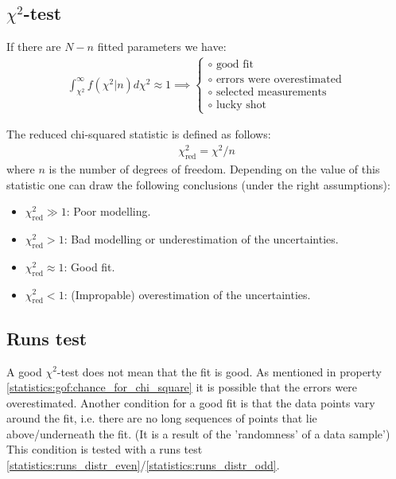 {\subsection{\texorpdfstring{$\chi^2$}{Chi squared}-test}\label{statistics:section:chi_squared_test}

        \begin{property}
        	If there are $N - n$ fitted parameters we have:
		\begin{gather}
			\label{statistics:gof:chance_for_chi_square}
                	\int_{\chi^2}^\infty f\left(\chi^2|n\right)d\chi^2 \approx 1\implies
	                \begin{cases}
				\circ\text{ good fit}\\
	                	\circ\text{ errors were overestimated}\\
	                	\circ\text{ selected measurements}\\
	                	\circ\text{ lucky shot}
        	        \end{cases}
		\end{gather}
	\end{property}
        \begin{property}
		The reduced chi-squared statistic is defined as follows:
		\begin{gather}
			\chi^2_{\text{red}} = \chi^2/n
		\end{gather}
		where $n$ is the number of degrees of freedom. Depending on the value of this statistic one can draw the following conclusions (under the right assumptions):
		\begin{itemize}
                	\item $\chi^2_{\text{red}} \gg 1$: Poor modelling.
                	\item $\chi^2_{\text{red}} > 1$: Bad modelling or underestimation of the uncertainties.
                	\item $\chi^2_{\text{red}} \approx 1$: Good fit.
                	\item $\chi^2_{\text{red}} < 1$: (Impropable) overestimation of the uncertainties. 
		\end{itemize}
	\end{property}
    
\subsection{Runs test}
	
	A good $\chi^2$-test does not mean that the fit is good. As mentioned in property \ref{statistics:gof:chance_for_chi_square} it is possible that the errors were overestimated. Another condition for a good fit is that the data points vary around the fit, i.e. there are no long sequences of points that lie above/underneath the fit. (It is a result of the 'randomness' of a data sample') This condition is tested with a runs test \ref{statistics:runs_distr_even}/\ref{statistics:runs_distr_odd}.
    
}
